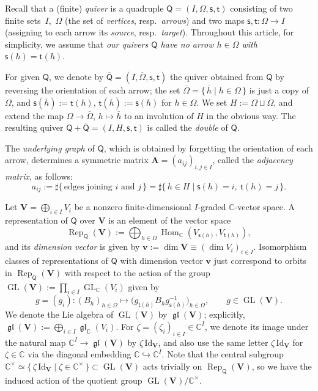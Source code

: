 \documentclass[11pt]{article}
\numberwithin{equation}{section}
\theoremstyle{definition}
\newcommand{\C}{\mathbb{C}} %
\newcommand{\GL}{\operatorname{GL}} %
\newcommand{\gl}{\operatorname{\mathfrak{gl}}}
\newcommand{\Hom}{\operatorname{Hom}}
\newcommand{\unit}{\mathrm{Id}}
\newcommand{\Rep}{\operatorname{Rep}}
\newcommand{\bA}{\mathbf{A}} %
\newcommand{\bV}{\mathbf{V}}
\newcommand{\bv}{\mathbf{v}}
\newcommand{\ov}{\overline}
\newcommand{\vin}{\mathsf{t}} %
\newcommand{\vout}{\mathsf{s}} %
\newcommand{\QQ}{\mathsf{Q}} %
\begin{document}
Recall that a (f\/inite) {\em quiver} is a
quadruple $\QQ=(I,\Omega,\vout,\vin)$ consisting of
two f\/inite sets~$I$,~$\Omega$
(the set of {\em vertices}, resp.\ {\em arrows})
and two maps
$\vout, \vin \colon \Omega \to I$
(assigning to each arrow
its {\em source}, resp.\ {\em target}).
Throughout this article, for simplicity,
we assume that {\em our quivers $\QQ$
have no arrow $h \in \Omega$ with $\vout(h)=\vin(h)$}.

For given $\QQ$, we denote by $\ov{\QQ}=(I,\ov{\Omega},\vout,\vin)$
the quiver obtained from $\QQ$ by reversing the orientation of each arrow;
the set $\ov{\Omega}=\{\, \ov h \mid h \in \Omega \,\}$
is just a copy of $\Omega$,
and $\vout(\ov h):=\vin(h)$, $\vin(\ov h):=\vout(h)$
for $h \in \Omega$.
We set $H := \Omega \sqcup \ov{\Omega}$,
and extend the map $\Omega \to \ov{\Omega}$, $h \mapsto \ov h$ to
an involution of $H$ in the obvious way.
The resulting quiver $\QQ + \ov{\QQ} =(I,H,\vout,\vin)$
is called the {\em double} of $\QQ$.

The {\em underlying graph} of $\QQ$,
which is obtained by forgetting the orientation of each arrow,
determines a symmetric matrix $\bA=(a_{ij})_{i,j \in I}$,
called the {\em adjacency matrix}, as follows:
\[
a_{ij} := \sharp\{\,\text{edges joining $i$ and $j$}\,\}
= \sharp\{\, h \in H \mid \vout(h)=i,\ \vin(h)=j \,\}.
\]

Let $\bV=\bigoplus_{i \in I} V_i$ be a nonzero f\/inite-dimensional
$I$-graded $\C$-vector space.
A representation of $\QQ$ over $\bV$ is an element of the vector space
\[
\Rep_\QQ(\bV):= \bigoplus_{h \in \Omega}
\Hom_\C(V_{\vout(h)},V_{\vin(h)}),
\]
and its {\em dimension vector} is given by
$\bv := \dim \bV \equiv (\dim V_i)_{i \in I}$.
Isomorphism classes of representations of $\QQ$ with dimension vector $\bv$
just correspond to orbits in $\Rep_\QQ(\bV)$
with respect to the action of the group
$\GL(\bV):=\prod\limits_{i \in I} \GL_\C(V_i)$ given by
\[
g=(g_i) \colon (B_h)_{h \in \Omega} \longmapsto
\bigl( g_{\vin(h)}B_h g_{\vout(h)}^{-1} \bigr)_{h \in \Omega},
\qquad g \in \GL(\bV).
\]
We denote the Lie algebra of $\GL(\bV)$ by $\gl(\bV)$; explicitly,
$\gl(\bV):=\bigoplus_{i \in I} \gl_\C(V_i)$.
For $\zeta =(\zeta_i)_{i \in I} \in \C^I$,
we denote its image under the natural map $\C^I \to \gl(\bV)$
by $\zeta\,\unit_\bV$,
and also use the same letter $\zeta\,\unit_\bV$
for $\zeta \in \C$ via the diagonal embedding $\C \hookrightarrow \C^I$.
Note that the central subgroup
$\C^\times \simeq
\{\,\zeta\,\unit_\bV \mid \zeta \in \C^\times\,\} \subset \GL(\bV)$
acts trivially on $\Rep_\QQ(\bV)$,
so we have the induced action of the quotient group
$\GL(\bV)/\C^\times$.
\end{document}
